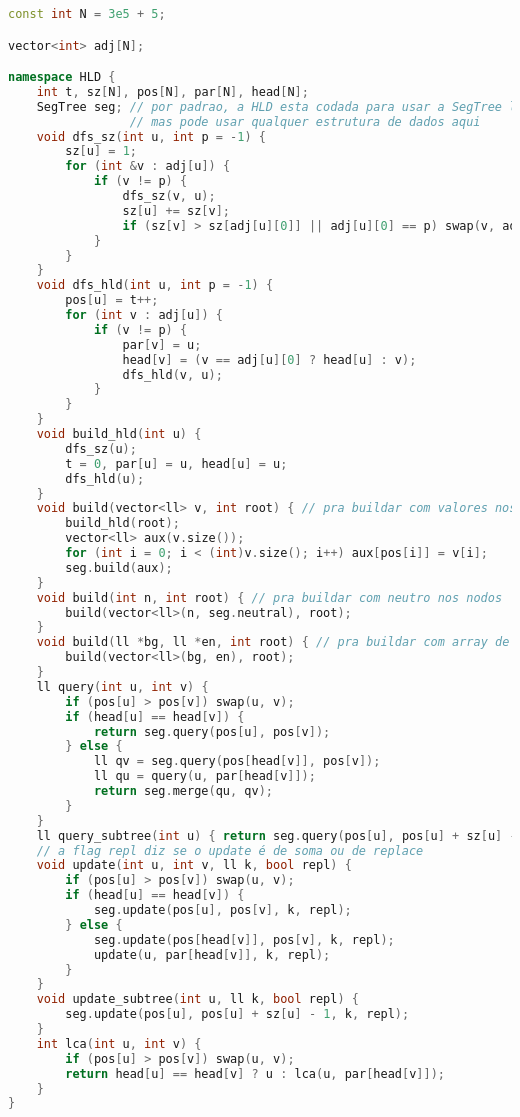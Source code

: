 \documentclass[10pt, a4paper, oneside]{book}
\begin{document}
\begin{lstlisting}[language=C++]
const int N = 3e5 + 5;

vector<int> adj[N];

namespace HLD {
    int t, sz[N], pos[N], par[N], head[N];
    SegTree seg; // por padrao, a HLD esta codada para usar a SegTree lazy,
                 // mas pode usar qualquer estrutura de dados aqui
    void dfs_sz(int u, int p = -1) {
        sz[u] = 1;
        for (int &v : adj[u]) {
            if (v != p) {
                dfs_sz(v, u);
                sz[u] += sz[v];
                if (sz[v] > sz[adj[u][0]] || adj[u][0] == p) swap(v, adj[u][0]);
            }
        }
    }
    void dfs_hld(int u, int p = -1) {
        pos[u] = t++;
        for (int v : adj[u]) {
            if (v != p) {
                par[v] = u;
                head[v] = (v == adj[u][0] ? head[u] : v);
                dfs_hld(v, u);
            }
        }
    }
    void build_hld(int u) {
        dfs_sz(u);
        t = 0, par[u] = u, head[u] = u;
        dfs_hld(u);
    }
    void build(vector<ll> v, int root) { // pra buildar com valores nos nodos
        build_hld(root);
        vector<ll> aux(v.size());
        for (int i = 0; i < (int)v.size(); i++) aux[pos[i]] = v[i];
        seg.build(aux);
    }
    void build(int n, int root) { // pra buildar com neutro nos nodos
        build(vector<ll>(n, seg.neutral), root);
    }
    void build(ll *bg, ll *en, int root) { // pra buildar com array de C
        build(vector<ll>(bg, en), root);
    }
    ll query(int u, int v) {
        if (pos[u] > pos[v]) swap(u, v);
        if (head[u] == head[v]) {
            return seg.query(pos[u], pos[v]);
        } else {
            ll qv = seg.query(pos[head[v]], pos[v]);
            ll qu = query(u, par[head[v]]);
            return seg.merge(qu, qv);
        }
    }
    ll query_subtree(int u) { return seg.query(pos[u], pos[u] + sz[u] - 1); }
    // a flag repl diz se o update é de soma ou de replace
    void update(int u, int v, ll k, bool repl) {
        if (pos[u] > pos[v]) swap(u, v);
        if (head[u] == head[v]) {
            seg.update(pos[u], pos[v], k, repl);
        } else {
            seg.update(pos[head[v]], pos[v], k, repl);
            update(u, par[head[v]], k, repl);
        }
    }
    void update_subtree(int u, ll k, bool repl) {
        seg.update(pos[u], pos[u] + sz[u] - 1, k, repl);
    }
    int lca(int u, int v) {
        if (pos[u] > pos[v]) swap(u, v);
        return head[u] == head[v] ? u : lca(u, par[head[v]]);
    }
}
\end{lstlisting}
\hfill
\end{document}
